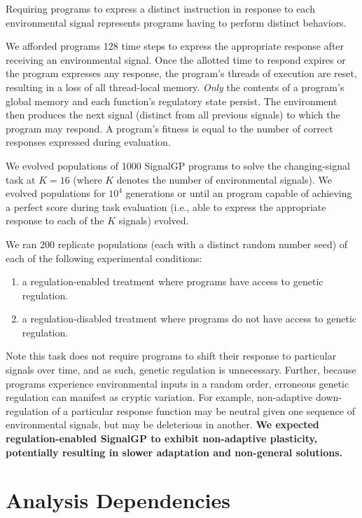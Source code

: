 \documentclass[
]{book}
\providecommand{\tightlist}{%
  \setlength{\itemsep}{0pt}\setlength{\parskip}{0pt}}
\begin{document}
Requiring programs to express a distinct instruction in response to each environmental signal represents programs having to perform distinct behaviors.

We afforded programs 128 time steps to express the appropriate response after receiving an environmental signal.
Once the allotted time to respond expires or the program expresses any response, the program's threads of execution are reset, resulting in a loss of all thread-local memory.
\emph{Only} the contents of a program's global memory and each function's regulatory state persist.
The environment then produces the next signal (distinct from all previous signals) to which the program may respond.
A program's fitness is equal to the number of correct responses expressed during evaluation.

We evolved populations of 1000 SignalGP programs to solve the changing-signal task at \(K=16\) (where \(K\) denotes the number of environmental signals).
We evolved populations for \ensuremath{10^{4}} generations or until an program capable of achieving a perfect score during task evaluation (i.e., able to express the appropriate response to each of the \(K\) signals) evolved.

We ran 200 replicate populations (each with a distinct random number seed) of each of the following experimental conditions:

\begin{enumerate}
\def\labelenumi{\arabic{enumi}.}
\tightlist
\item
  a regulation-enabled treatment where programs have access to genetic regulation.
\item
  a regulation-disabled treatment where programs do not have access to genetic regulation.
\end{enumerate}

Note this task does not require programs to shift their response to particular signals over time, and as such, genetic regulation is unnecessary.
Further, because programs experience environmental inputs in a random order, erroneous genetic regulation can manifest as cryptic variation.
For example, non-adaptive down-regulation of a particular response function may be neutral given one sequence of environmental signals, but may be deleterious in another.
\textbf{We expected regulation-enabled SignalGP to exhibit non-adaptive plasticity, potentially resulting in slower adaptation and non-general solutions.}

\hypertarget{analysis-dependencies}{%
\section{Analysis Dependencies}\label{analysis-dependencies}}
\end{document}
